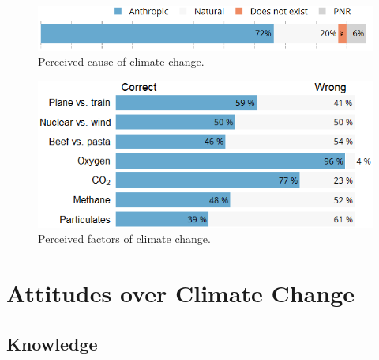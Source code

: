\documentclass[english,5p,authoryear]{elsarticle}
\begin{document}
\begin{figure}[t]
\centering
\includegraphics[width=\columnwidth]{Images/CC_cause_nolegend.png}
\caption{Perceived cause of climate change.}
\label{fig:cause}
\end{figure}

\begin{figure}[t]
\centering
\includegraphics[width=\columnwidth]{Images/CC_knowledge_valbtr.png}
\caption{Perceived factors of climate change.}
\label{fig:factors}
\end{figure}

\section{Attitudes over Climate Change\label{sec:attitudes_climate_change}}
    
    \subsection{Knowledge\label{subsec:knowledge}}
\end{document}
